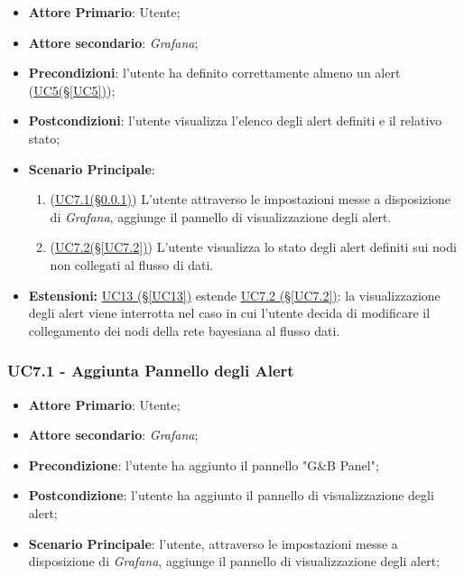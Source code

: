 \begin{itemize}
	\item \textbf{Attore Primario}: Utente;
	\item \textbf{Attore secondario}: \textit{Grafana};
	\item \textbf{Precondizioni}: l'utente ha definito correttamente almeno un alert (\hyperref[UC5]{UC5(§\ref*{UC5})});
	\item \textbf{Postcondizioni}: l'utente visualizza l'elenco degli alert definiti e il relativo stato;
	\item \textbf{Scenario Principale}:
	\begin{enumerate}
		\item (\hyperref[UC7.1]{UC7.1(§\ref*{UC7.1})}) L'utente attraverso le impostazioni messe a disposizione di \textit{Grafana}, aggiunge il pannello di visualizzazione degli alert.
		\item (\hyperref[UC7.2]{UC7.2(§\ref*{UC7.2})}) L'utente visualizza lo stato degli alert definiti sui nodi non collegati al flusso di dati.
	\end{enumerate}
	\item \textbf{Estensioni:} \hyperref[UC13]{UC13 (§\ref*{UC13})} estende \hyperref[UC7.2]{UC7.2 (§\ref*{UC7.2})}: la visualizzazione degli alert viene interrotta nel caso in cui l'utente decida di modificare il collegamento dei nodi della rete bayesiana al flusso dati.
\end{itemize}

\newpage

\subsubsection{UC7.1 - Aggiunta Pannello degli Alert }\label{UC7.1}
\begin{itemize}
	\item \textbf{Attore Primario}: Utente;
	\item \textbf{Attore secondario}: \textit{Grafana};
	\item \textbf{Precondizione}: l'utente ha aggiunto il pannello "G\&B Panel";
	\item \textbf{Postcondizione}: l'utente ha aggiunto il pannello di visualizzazione degli alert;
	\item \textbf{Scenario Principale}: l'utente, attraverso le impostazioni messe a disposizione di \textit{Grafana}, aggiunge il pannello di visualizzazione degli alert;
\end{itemize}

